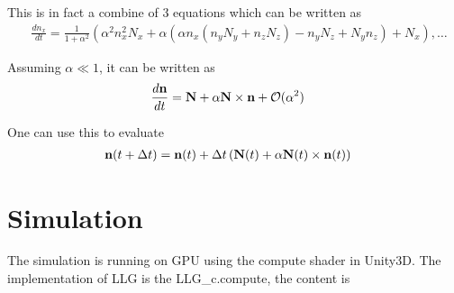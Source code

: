 \documentclass[aps,superscriptaddress,groupedaddress]{revtex4}  %
\begin{document}
This is in fact a combine of $3$ equations which can be written as
\begin{equation}
\begin{split}
&\frac{dn_x}{dt}=\frac{1}{1+\alpha ^2}\left(\alpha^2 n_x^2 N_x+\alpha (\alpha n_x (n_y N_y+n_z N_z)-n_y N_z+N_y n_z)+N_x\right),\ldots
\end{split}
\end{equation}

Assuming $\alpha \ll 1$, it can be written as
\begin{equation}
\begin{split}
&\frac{d{\bf n}}{dt}={\bf N}+\alpha {\bf N}\times {\bf n}+\mathcal{O}(\alpha ^2)
\end{split}
\end{equation}

One can use this to evaluate
\begin{equation}
\begin{split}
&{\bf n}(t+\Delta t)={\bf n}(t)+\Delta t \left({\bf N}(t)+\alpha {\bf N}(t)\times {\bf n}(t)\right)
\end{split}
\end{equation}

\section{\label{sec:4}Simulation}

The simulation is running on GPU using the compute shader in Unity3D. The implementation of LLG is the LLG\_c.compute, the content is

\end{document}
